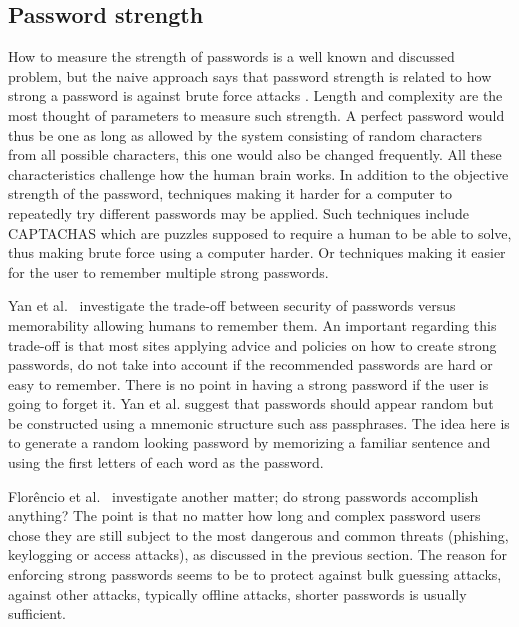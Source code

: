 \subsection{Password strength}\label{password-strength}
How to measure the strength of passwords is a well known and discussed problem, but the naive approach says that password strength is related to how strong a password is against brute force attacks \cite{password-strength}. Length and complexity are the most thought of parameters to measure such strength. A perfect password would thus be one as long as allowed by the system consisting of random characters from all possible characters, this one would also be changed frequently. All these characteristics challenge how the human brain works. In addition to the objective strength of the password, techniques making it harder for a computer to repeatedly try different passwords may be applied. Such techniques include CAPTACHAS \cite{captcha} which are puzzles supposed to require a human to be able to solve, thus making brute force using a computer harder. Or techniques making it easier for the user to remember multiple strong passwords.
\par Yan et al.~\cite{memorability_yan} investigate the trade-off between security of passwords versus memorability allowing humans to remember them. An important regarding this trade-off is that most sites applying advice and policies on how to create strong passwords, do not take into account if the recommended passwords are hard or easy to remember. There is no point in having a strong password if the user is going to forget it. Yan et al. suggest that passwords should appear random but be constructed using a  mnemonic structure such ass passphrases. The idea here is to generate a random looking password by memorizing a familiar sentence and using the first letters of each word as the password. 
\par Florêncio et al.~\cite{strong-pws_florencio} investigate another matter; do strong passwords accomplish anything? The point is that no matter how long and complex password users chose they are still subject to the most dangerous and common threats (phishing, keylogging or access attacks), as discussed in the previous section. The reason for enforcing strong passwords seems to be to protect against bulk guessing attacks, against other attacks, typically offline attacks, shorter passwords is usually sufficient. 

